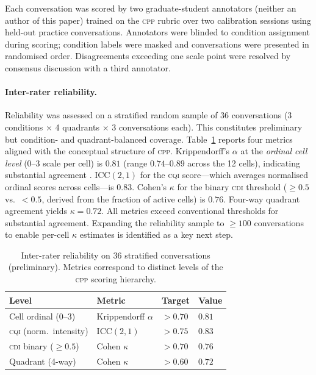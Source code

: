 \documentclass{article}
\newcommand{\CDI}{\textsc{cdi}}
\newcommand{\CQI}{\textsc{cqi}}
\newcommand{\CPP}{\textsc{cpp}}
\begin{document}
Each conversation was scored by two graduate-student annotators
(neither an author of this paper) trained on the \CPP{} rubric over
two calibration sessions using held-out practice conversations. Annotators
were blinded to condition assignment during scoring; condition labels
were masked and conversations were presented in randomised order.
Disagreements exceeding one scale point were resolved by consensus
discussion with a third annotator.

\paragraph{Inter-rater reliability.}
Reliability was assessed on a stratified random sample of 36 conversations
(3 conditions $\times$ 4 quadrants $\times$ 3 conversations each).
This constitutes preliminary but condition- and quadrant-balanced
coverage. Table~\ref{tab:reliability} reports four metrics aligned
with the conceptual structure of \CPP{}. Krippendorff's $\alpha$ at
the \emph{ordinal cell level} (0--3 scale per cell) is $0.81$ (range
$0.74$--$0.89$ across the 12 cells), indicating substantial agreement
\citep{hayes2007answering}. $\text{ICC}(2,1)$ for the \CQI{}
score---which averages normalised ordinal scores across cells---is
$0.83$. Cohen's $\kappa$ for the binary \CDI{} threshold ($\geq 0.5$
vs.\ $< 0.5$, derived from the fraction of active cells) is $0.76$.
Four-way quadrant agreement yields $\kappa = 0.72$. All metrics exceed
conventional thresholds for substantial agreement. Expanding the
reliability sample to $\geq 100$ conversations to enable per-cell
$\kappa$ estimates is identified as a key next step.

\begin{table}[t]
  \caption{Inter-rater reliability on 36 stratified conversations
  (preliminary). Metrics correspond to distinct levels of the \CPP{}
  scoring hierarchy.}
  \label{tab:reliability}
  \centering
  \begin{tabular}{llll}
    \toprule
    \textbf{Level} & \textbf{Metric} & \textbf{Target} & \textbf{Value} \\
    \midrule
    Cell ordinal (0--3)     & Krippendorff $\alpha$           & $>0.70$ & $0.81$ \\
    \CQI{} (norm.\ intensity) & ICC$(2,1)$                    & $>0.75$ & $0.83$ \\
    \CDI{} binary ($\geq\!0.5$) & Cohen $\kappa$              & $>0.70$ & $0.76$ \\
    Quadrant (4-way)        & Cohen $\kappa$                  & $>0.60$ & $0.72$ \\
    \bottomrule
  \end{tabular}
\end{table}
\end{document}
